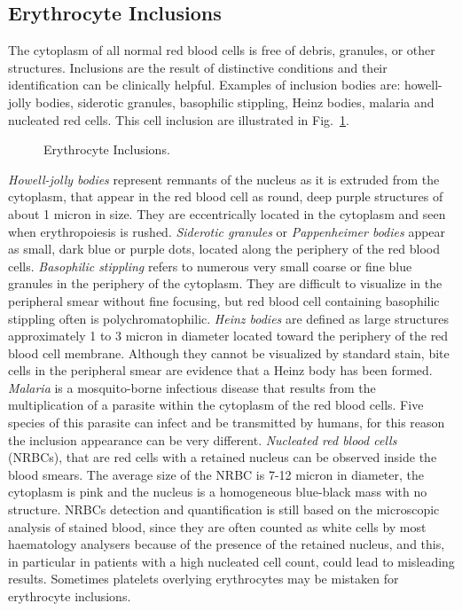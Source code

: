 \documentclass[final,a4paper,12pt,english]{UnicaPhdThesis3}
\begin{document}
\subsection{Erythrocyte Inclusions}
The cytoplasm of all normal red blood cells is free of debris, granules, or other structures. Inclusions are the result of distinctive conditions and their identification can be clinically helpful. Examples of inclusion bodies are: howell-jolly bodies, siderotic granules, basophilic stippling, Heinz bodies, malaria and nucleated red cells. This cell inclusion are illustrated in Fig.~\ref{fig:Inclusions}.

\begin{figure}[!htbp]
\centering
\caption{\label{fig:Inclusions} Erythrocyte Inclusions.}
\end{figure}

\textit{Howell-jolly bodies} represent remnants of the nucleus as it is extruded from the cytoplasm, that appear in the red blood cell as round, deep purple structures of about 1 micron in size. They are eccentrically located in the cytoplasm and seen when erythropoiesis is rushed. \textit{Siderotic granules} or \textit{Pappenheimer bodies} appear as small, dark blue or purple dots, located along the periphery of the red blood cells. \textit{Basophilic stippling} refers to numerous very small coarse or fine blue granules in the periphery of the cytoplasm. They are difficult to visualize in the peripheral smear without fine focusing, but red blood cell containing basophilic stippling often is polychromatophilic. \textit{Heinz bodies} are defined as large structures approximately 1 to 3 micron in diameter located toward the periphery of the red blood cell membrane. Although they cannot be visualized by standard stain, bite cells in the peripheral smear are evidence that a Heinz body has been formed. \textit{Malaria} is a mosquito-borne infectious disease that results from the multiplication of a parasite within the cytoplasm of the red blood cells. Five species of this parasite can infect and be transmitted by humans, for this reason the inclusion appearance can be very different. \textit{Nucleated red blood cells} (NRBCs), that are red cells with a retained nucleus can be observed inside the blood smears. The average size of the NRBC is 7-12 micron in diameter, the cytoplasm is pink and the nucleus is a homogeneous blue-black mass with no structure. NRBCs detection and quantification is still based on the microscopic analysis of stained blood, since they are often counted as white cells by most haematology analysers because of the presence of the retained nucleus, and this, in particular in patients with a high nucleated cell count, could lead to misleading results. Sometimes platelets overlying erythrocytes may be mistaken for erythrocyte inclusions. 
\end{document}

